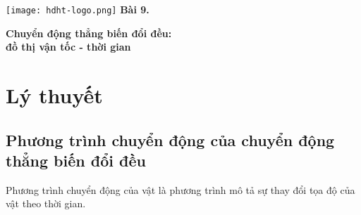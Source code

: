 \newcommand{\chapter}[2][]{
	\newcommand{\chapname}{#2}
	\begin{flushleft}
		\begin{minipage}[t]{\linewidth}
			\texttt{[image: hdht-logo.png]}
			\hspace{0pt}	
			\sffamily\bfseries\large Bài  9.
			\begin{flushleft}
				\LARGE\bfseries #1
			\end{flushleft}
		\end{minipage}
	\end{flushleft}
	\vspace{1cm}
	\normalfont\normalsize
}
\chapter[Chuyển động thẳng biến đổi đều:\\ đồ thị vận tốc - thời gian]{Chuyển động thẳng biến đổi đều: \\đồ thị vận tốc - thời gian}
\section{Lý thuyết}
\subsection{Phương trình chuyển động của chuyển động thẳng biến đổi đều}
Phương trình chuyển động của vật là phương trình mô tả sự thay đổi tọa độ của vật theo thời gian. 


